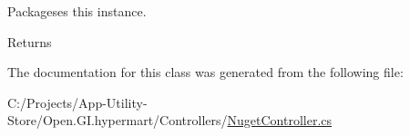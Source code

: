 Packageses this instance. 

\begin{DoxyReturn}{Returns}

\end{DoxyReturn}


The documentation for this class was generated from the following file\+:\begin{DoxyCompactItemize}
\item 
C\+:/\+Projects/\+App-\/\+Utility-\/\+Store/\+Open.\+G\+I.\+hypermart/\+Controllers/\hyperlink{_nuget_controller_8cs}{Nuget\+Controller.\+cs}\end{DoxyCompactItemize}
